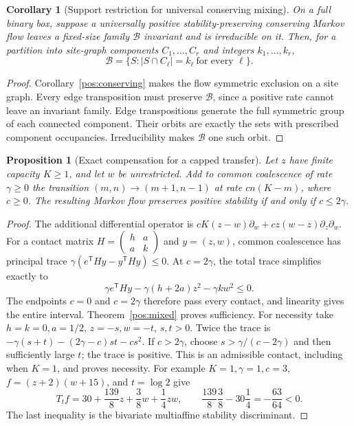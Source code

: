 \documentclass[reqno]{amsart}
\newtheorem{proposition}[theorem]{Proposition}
\newtheorem{corollary}[theorem]{Corollary}
\theoremstyle{definition}
\theoremstyle{remark}
\begin{document}
\begin{corollary}[Support restriction for universal conserving mixing]\label{pos:support-mixing}
On a full binary box, suppose a universally positive stability-preserving
conserving Markov flow leaves a fixed-size family \(\mathcal B\) invariant
and is irreducible on it.  Then, for a partition into site-graph components
\(C_1,\ldots,C_r\) and integers \(k_1,\ldots,k_r\),
\[
 \mathcal B=\{S:|S\cap C_\ell|=k_\ell\ \text{for every }\ell\}.
\]
\end{corollary}
\begin{proof}
Corollary~\ref{pos:conserving} makes the flow symmetric exclusion on a site graph.
Every edge transposition must preserve \(\mathcal B\), since a positive rate
cannot leave an invariant family.  Edge transpositions generate the full
symmetric group of each connected component.  Their orbits are exactly the
sets with prescribed component occupancies.  Irreducibility makes
\(\mathcal B\) one such orbit.
\end{proof}

\begin{proposition}[Exact compensation for a capped transfer]\label{pos:compensation}
Let \(z\) have finite capacity \(K\ge1\), and let \(w\) be unrestricted.
Add to common coalescence of rate \(\gamma\ge0\) the transition
\((m,n)\to(m+1,n-1)\) at rate \(cn(K-m)\), where \(c\ge0\).
The resulting Markov flow preserves positive stability if and only if
\(c\le2\gamma\).
\end{proposition}
\begin{proof}
The additional differential operator is
\(cK(z-w)\partial_w+cz(w-z)\partial_z\partial_w\).
For a contact matrix \(H=\left(\begin{smallmatrix}h&a\\a&k\end{smallmatrix}\right)\)
and \(y=(z,w)\), common coalescence has principal trace
\(\gamma(e^{\mathsf T}Hy-y^{\mathsf T}Hy)\le0\).
At \(c=2\gamma\), the total trace simplifies exactly to
\[
 \gamma e^{\mathsf T}Hy-\gamma(h+2a)z^2-\gamma k w^2\le0.
\]
The endpoints \(c=0\) and \(c=2\gamma\) therefore pass every contact, and
linearity gives the entire interval.  Theorem~\ref{pos:mixed} proves sufficiency.
For necessity take \(h=k=0,a=1/2\), \(z=-s,w=-t\), \(s,t>0\).
Twice the trace is
\(-\gamma(s+t)-(2\gamma-c)st-cs^2\).
If \(c>2\gamma\), choose \(s>\gamma/(c-2\gamma)\) and then sufficiently large
\(t\); the trace is positive.  This is an admissible contact, including when
\(K=1\), and proves necessity.
For example \(K=1,\gamma=1,c=3\), \(f=(z+2)(w+15)\), and \(t=\log2\) give
\[
 T_tf=30+\frac{139}{8}z+\frac38w+\frac14zw,
 \qquad
 \frac{139}{8}\frac38-30\frac14=-\frac{63}{64}<0.
\]
The last inequality is the bivariate multiaffine stability discriminant.
\end{proof}
\end{document}

